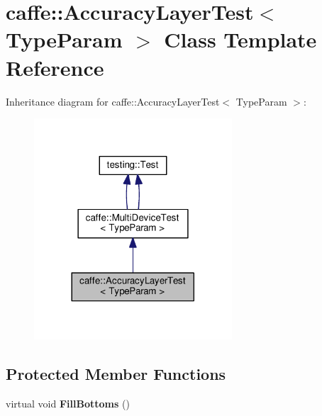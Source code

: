 \hypertarget{classcaffe_1_1_accuracy_layer_test}{}\section{caffe\+:\+:Accuracy\+Layer\+Test$<$ Type\+Param $>$ Class Template Reference}
\label{classcaffe_1_1_accuracy_layer_test}


Inheritance diagram for caffe\+:\+:Accuracy\+Layer\+Test$<$ Type\+Param $>$\+:
\nopagebreak
\begin{figure}[H]
\begin{center}
\leavevmode
\includegraphics[width=209pt]{classcaffe_1_1_accuracy_layer_test__inherit__graph}
\end{center}
\end{figure}
\subsection*{Protected Member Functions}
\begin{DoxyCompactItemize}
\item 
\mbox{\label{classcaffe_1_1_accuracy_layer_test_af83eff77a67c679e8bef7ad5aef64cb9}} 
virtual void {\bfseries Fill\+Bottoms} ()
\end{DoxyCompactItemize}
